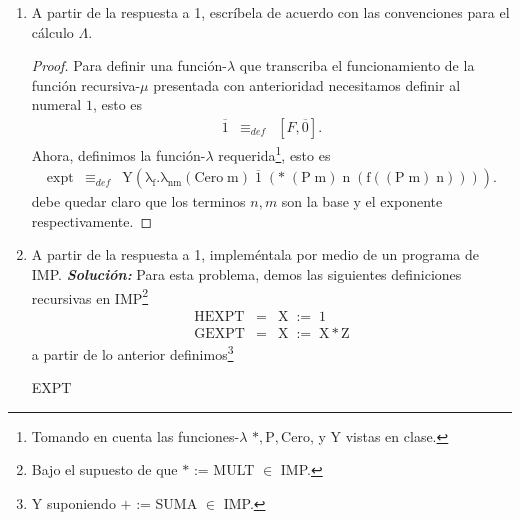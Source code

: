 \documentclass{article}
\begin{document}
\begin{enumerate}
\begin{proof}
\begin{eqnarray*}
    \end{eqnarray*}
  \end{proof}
\item A partir de la respuesta a 1, escríbela de acuerdo con las convenciones
  para el cálculo $\Lambda$.
  \begin{proof}
    Para definir una función-$\lambda$ que transcriba el funcionamiento de la función recursiva-$\mu$ presentada
    con anterioridad necesitamos definir al numeral $1$, esto es
    \begin{eqnarray*}
      \overline{1} &\equiv_{def}& \left[F, \overline{0}\right].
    \end{eqnarray*}
    Ahora, definimos la función-$\lambda$ requerida\footnote{Tomando en cuenta las funciones-$\lambda$ $\mathrm{*, P, Cero}$,
    y $\mathrm{Y}$ vistas en clase.}, esto es
    \begin{eqnarray*}
      \mathrm{expt} &\equiv_{def}& \mathrm{Y\left(\lambda_{f}.\lambda_{nm}(Cero\; m)\;\overline{1}\;(*\; (P\; m)\; n\; (f((P\; m)\; n)))\right)}.
    \end{eqnarray*}
    debe quedar claro que los terminos $n, m$ son la base y el exponente respectivamente.
  \end{proof}
\item A partir de la respuesta a 1, impleméntala por medio de un programa
  de IMP.
  \newline
  \newline
  \textbf{\textit{Solución:}} Para esta problema, demos las siguientes definiciones recursivas en IMP\footnote{Bajo el supuesto de que $*$ := MULT $\in$ IMP.}
  \begin{eqnarray*}
    \mathrm{HEXPT} &=& \mathrm{X}\; :=\; 1\\
    \mathrm{GEXPT} &=& \mathrm{X\; :=\; X * Z}
  \end{eqnarray*}
  a partir de lo anterior definimos\footnote{Y suponiendo $+$ := SUMA $\in$ IMP.}
  
  \begin{algorithm}[H]
    \SetAlgorithmName{}{}%
    \DontPrintSemicolon

               {}
               \caption{EXPT} \label{sigma}%
               \DecMargin{1em}
  \end{algorithm}

\end{enumerate}
\end{document}
